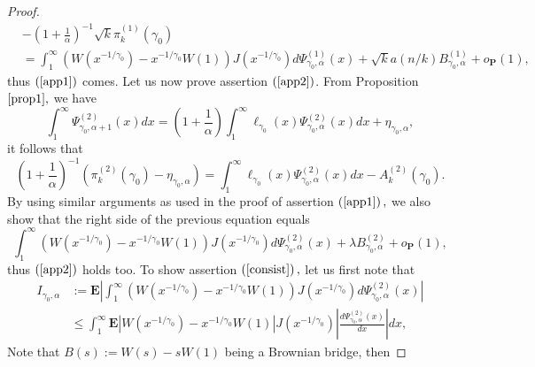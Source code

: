\documentclass[12pt,reqno,openbib,runningheads,a4paper,portrait]{amsart}%
\begin{document}
\begin{proof}
\begin{align*}
&  -\left(  1+\frac{1}{\alpha}\right)  ^{-1}\sqrt{k}\pi_{k}^{\left(  1\right)
}\left(  \gamma_{0}\right) \\
&  =\int_{1}^{\infty}\left(  W\left(  x^{-1/\gamma_{0}}\right)  -x^{-1/\gamma
_{0}}W\left(  1\right)  \right)  J\left(  x^{-1/\gamma_{0}}\right)
d\Psi_{\gamma_{0},\alpha}^{\left(  1\right)  }\left(  x\right)  +\sqrt
{k}a\left(  n/k\right)  B_{\gamma_{0},\alpha}^{\left(  1\right)
}+o_{\mathbf{P}}\left(  1\right)  ,
\end{align*}
thus $\left(  \ref{app1}\right)  $ comes. Let us now prove assertion $\left(
\ref{app2}\right)  $. From Proposition $\ref{prop1},$ we have%
\[
\int_{1}^{\infty}\Psi_{\gamma_{0},\alpha+1}^{\left(  2\right)  }\left(
x\right)  dx=\left(  1+\frac{1}{\alpha}\right)  \int_{1}^{\infty}\ell
_{\gamma_{0}}\left(  x\right)  \Psi_{\gamma_{0},\alpha}^{\left(  2\right)
}\left(  x\right)  dx+\eta_{\gamma_{0},\alpha},
\]
it follows that%
\[
\left(  1+\frac{1}{\alpha}\right)  ^{-1}\left(  \pi_{k}^{\left(  2\right)
}\left(  \gamma_{0}\right)  -\eta_{\gamma_{0},\alpha}\right)  =\int%
_{1}^{\infty}\ell_{\gamma_{0}}\left(  x\right)  \Psi_{\gamma_{0},\alpha
}^{\left(  2\right)  }\left(  x\right)  dx-A_{k}^{\left(  2\right)  }\left(
\gamma_{0}\right)  .
\]
By using similar arguments as used in the proof of assertion $\left(
\ref{app1}\right)  ,$ we also show that the right side of the previous
equation equals
\[
\int_{1}^{\infty}\left(  W\left(  x^{-1/\gamma_{0}}\right)  -x^{-1/\gamma_{0}%
}W\left(  1\right)  \right)  J\left(  x^{-1/\gamma_{0}}\right)  d\Psi
_{\gamma_{0},\alpha}^{\left(  2\right)  }\left(  x\right)  +\lambda
B_{\gamma_{0},\alpha}^{\left(  2\right)  }+o_{\mathbf{P}}\left(  1\right)  ,
\]
thus $\left(  \ref{app2}\right)  $ holds too. To show assertion $\left(
\ref{consist}\right)  ,$ let us first note that
\begin{align*}
I_{\gamma_{0},\alpha}  &  :=\mathbf{E}\left\vert \int_{1}^{\infty}\left(
W\left(  x^{-1/\gamma_{0}}\right)  -x^{-1/\gamma_{0}}W\left(  1\right)
\right)  J\left(  x^{-1/\gamma_{0}}\right)  d\Psi_{\gamma_{0},\alpha}^{\left(
2\right)  }\left(  x\right)  \right\vert \\
&  \leq\int_{1}^{\infty}\mathbf{E}\left\vert W\left(  x^{-1/\gamma_{0}%
}\right)  -x^{-1/\gamma_{0}}W\left(  1\right)  \right\vert J\left(
x^{-1/\gamma_{0}}\right)  \left\vert \frac{d\Psi_{\gamma_{0},\alpha}^{\left(
2\right)  }\left(  x\right)  }{dx}\right\vert dx,
\end{align*}
Note that $B\left(  s\right)  :=W\left(  s\right)  -sW\left(  1\right)  $
being a Brownian bridge, then

\end{proof}
\end{document}
